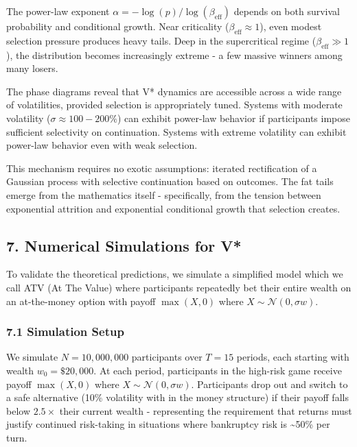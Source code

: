 \documentclass[
  11pt,
  openany]{article}
\begin{document}
The power-law exponent \(\alpha = -\log(p)/\log(\beta_{\text{eff}})\)
depends on both survival probability and conditional growth. Near
criticality (\(\beta_{\text{eff}} \approx 1\)), even modest selection
pressure produces heavy tails. Deep in the supercritical regime
(\(\beta_{\text{eff}} \gg 1\)), the distribution becomes increasingly
extreme - a few massive winners among many losers.

The phase diagrams reveal that V* dynamics are accessible across a wide
range of volatilities, provided selection is appropriately tuned.
Systems with moderate volatility (\(\sigma \approx 100-200\%\)) can
exhibit power-law behavior if participants impose sufficient selectivity
on continuation. Systems with extreme volatility can exhibit power-law
behavior even with weak selection.

This mechanism requires no exotic assumptions: iterated rectification of
a Gaussian process with selective continuation based on outcomes. The
fat tails emerge from the mathematics itself - specifically, from the
tension between exponential attrition and exponential conditional growth
that selection creates.

\subsection{7. Numerical Simulations for
V*}\label{numerical-simulations-for-v}

To validate the theoretical predictions, we simulate a simplified model
which we call ATV (At The Value) where participants repeatedly bet their
entire wealth on an at-the-money option with payoff \(\max(X, 0)\) where
\(X \sim \mathcal{N}(0, \sigma w)\).

\subsubsection{7.1 Simulation Setup}\label{simulation-setup}

We simulate \(N = 10{,}000{,}000\) participants over \(T = 15\) periods,
each starting with wealth \(w_0 = \$20{,}000\). At each period,
participants in the high-risk game receive payoff \(\max(X, 0)\) where
\(X \sim \mathcal{N}(0, \sigma w)\). Participants drop out and switch to
a safe alternative (10\% volatility with in the money structure) if
their payoff falls below \(2.5 \times\) their current wealth -
representing the requirement that returns must justify continued
risk-taking in situations where bankruptcy risk is \textasciitilde50\%
per turn.
\end{document}
